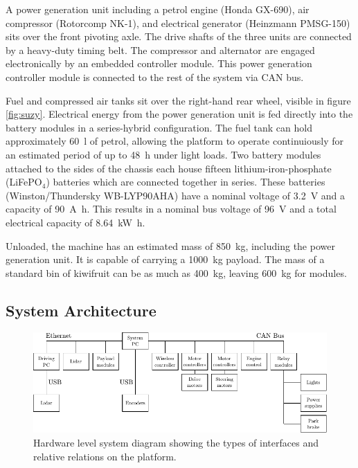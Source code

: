\documentclass[preprint,authoryear,12pt]{elsarticle}
\begin{document}
        A power generation unit including a petrol engine (Honda GX-690), air compressor (Rotorcomp NK-1), and electrical generator (Heinzmann PMSG-150) sits over the front pivoting axle.
        The drive shafts of the three units are connected by a heavy-duty timing belt.
        The compressor and alternator are engaged electronically by an embedded controller module.
        This power generation controller module is connected to the rest of the system via CAN bus.
        
        Fuel and compressed air tanks sit over the right-hand rear wheel, visible in figure \ref{fig:suzy}.
        Electrical energy from the power generation unit is fed directly into the battery modules in a series-hybrid configuration. 
        The fuel tank can hold approximately \SI{60}{\litre} of petrol, allowing the platform to operate continuiously for an estimated period of up to \SI{48}{\hour} under light loads.
        Two battery modules attached to the sides of the chassis each house fifteen lithium-iron-phosphate (LiFePO$_{\text{4}}$) batteries which are connected together in series.
        These batteries (Winston/Thundersky WB-LYP90AHA) have a nominal voltage of \SI{3.2}{\volt} and a capacity of \SI{90}{\ampere\hour}.
        This results in a nominal bus voltage of \SI{96}{\volt} and a total electrical capacity of \SI{8.64}{\kilo\watt\hour}.

        Unloaded, the machine has an estimated mass of \SI{850}{\kilo\gram}, including the power generation unit.
        It is capable of carrying a \SI{1000}{\kilo\gram} payload.
        The mass of a standard bin of kiwifruit can be as much as \SI{400}{\kilo\gram}, leaving \SI{600}{\kilo\gram} for modules.

    \subsection{System Architecture}
    \label{sect:architecture}

        \begin{figure}[htb]
            \centering
            \includegraphics[width=\linewidth]{imgs/system_diagram/diagram_v3.pdf}
            \caption{Hardware level system diagram showing the types of interfaces and relative relations on the platform.}
            \label{fig:system_diagram}
        \end{figure}
\end{document}
